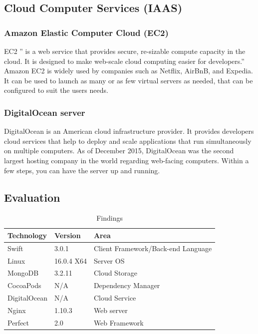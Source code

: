 \subsection{Cloud Computer Services (IAAS)}

\subsubsection{Amazon Elastic Computer Cloud (EC2)}
EC2 ” is a web service that provides secure, re-sizable compute capacity in the cloud. It is designed to make web-scale cloud computing easier for developers.” \cite{ec2} Amazon EC2 is widely used by companies such as Netflix, AirBnB, and Expedia. It can be used to launch as many or as few virtual servers as needed, that can be configured to suit the users needs.

\subsubsection{DigitalOcean server}

DigitalOcean \cite{digital} is an American cloud infrastructure provider. It provides developers cloud services that help to deploy and scale applications that run simultaneously on multiple computers. As of December 2015, DigitalOcean was the second largest hosting company in the world regarding web-facing computers. Within a few steps, you can have the server up and running.

\subsection{Evaluation}

\begin{table}[!h]
\centering
\caption{Findings}
\label{my-label}
\begin{tabular}{|l|l|l|}
\hline
\cellcolor{green!20}Technology & \cellcolor{green!20}Version  & \cellcolor{green!20}Area \\ \hline
Swift      & 3.0.1      & Client Framework/Back-end Language \\ \hline
Linux      & 16.0.4 X64 & Server OS                          \\ \hline
MongoDB    & 3.2.11     & Cloud Storage                      \\ \hline
CocoaPods  & N/A        & Dependency Manager                 \\ \hline
DigitalOcean    & N/A     & Cloud Service               \\ \hline
Nginx            & 1.10.3       & Web server               \\ \hline
Perfect            & 2.0      & Web Framework               \\ \hline
\end{tabular}
\end{table}

